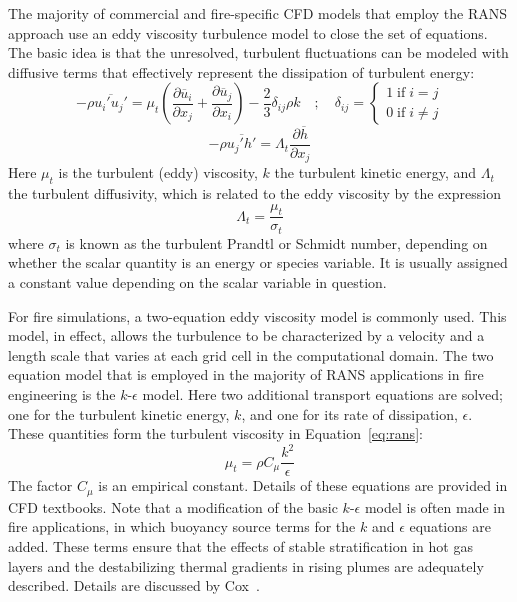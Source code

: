 \documentclass[graybox]{svmult}
\begin{document}
The majority of commercial and fire-specific CFD models that employ the RANS approach use an eddy viscosity turbulence model to close the set of equations. The basic idea is that the unresolved, turbulent fluctuations can be modeled with diffusive terms that effectively represent the dissipation of turbulent energy:
\begin{equation}
-\rho \overline{ u_i' u_j' } = \mu_t \left( \frac{\partial \overline{u}_i}{\partial x_j} + \frac{\partial \overline{u}_j}{\partial x_i} \right) - \frac{2}{3} \delta_{ij} \rho k \quad ; \quad \delta_{ij} = \left\{ \begin{array}{l} 1 \; \mathrm{if} \; i=j \\ 0 \; \mathrm{if} \; i\neq j \end{array} \right.
\label{eq:rans}
\end{equation}
\begin{equation}
-\rho \overline{ u_j' h' } = \Lambda_t \frac{\partial \overline{h}}{\partial x_j}
\end{equation}
Here  $\mu_t$ is the turbulent (eddy) viscosity, $k$ the turbulent kinetic energy, and $\Lambda_t$ the turbulent diffusivity, which is related to the eddy viscosity by the expression
\begin{equation}
\Lambda_t = \frac{\mu_t}{\sigma_t}
\end{equation}
where $\sigma_t$ is known as the turbulent Prandtl or Schmidt number, depending on whether the scalar quantity is an energy or species variable. It is usually assigned a constant value depending on the scalar variable in question.

For fire simulations, a two-equation eddy viscosity model is commonly used. This model, in effect, allows the turbulence to be characterized by a velocity and a length scale that varies at each grid cell in the computational domain. The two equation model that is employed in the majority of RANS applications in fire engineering is the $k$-$\epsilon$  model. Here two additional transport equations are solved; one for the turbulent kinetic energy, $k$, and one for its rate of dissipation, $\epsilon$. These quantities form the turbulent viscosity in Equation~\ref{eq:rans}:
\begin{equation}
\mu_t = \rho C_\mu \frac{k^2}{\epsilon}
\label{eq:mudef}
\end{equation}
The factor $C_\mu$ is an empirical constant. Details of these equations are provided in CFD textbooks. Note that a modification of the basic $k$-$\epsilon$ model is often made in fire applications, in which buoyancy source terms for the $k$ and $\epsilon$ equations are added. These terms ensure that the effects of stable stratification in hot gas layers and the destabilizing thermal gradients in rising plumes are adequately described. Details are discussed by Cox~\cite{Cox:1998}.
\end{document}
